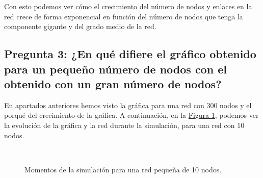 \documentclass[paper=a4, fontsize=11pt]{article} %
\numberwithin{equation}{section} %
\numberwithin{figure}{section} %
\numberwithin{table}{section} %
\begin{document}
Con esto podemos ver cómo el crecimiento del número de nodos y enlaces en la red crece de forma exponencial en función del número de nodos que tenga la componente gigante y del grado medio de la red.

\subsection{Pregunta 3: ¿En qué difiere el gráfico obtenido para un pequeño número de nodos con el obtenido con un gran número de nodos?}

En apartados anteriores hemos visto la gráfica para una red con 300 nodos y el porqué del crecimiento de la gráfica. A continuación, en la \hyperref[im_ej3]{Figura \ref{im_ej3}}, podemos ver la evolución de la gráfica y la red durante la simulación, para una red con 10 nodos.

\begin{figure}[H]
    \centering
    \mbox{
    }
    \mbox{
        \qquad
    }
    \caption{Momentos de la simulación para una red pequeña de 10 nodos.}
    \label{im_ej3}
\end{figure}
\end{document}
